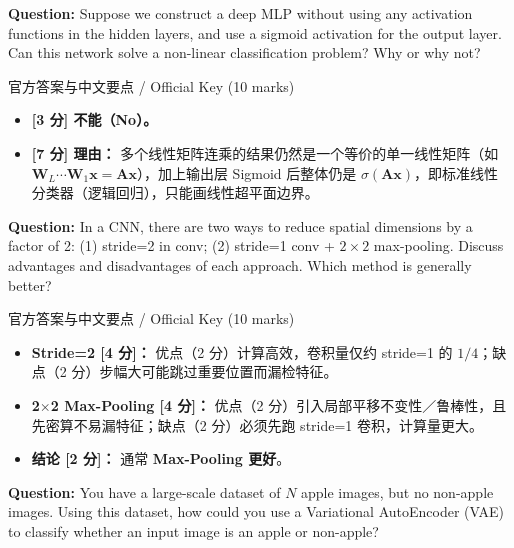 \textbf{Question:} Suppose we construct a deep MLP without using any activation functions in the hidden layers, and use a sigmoid activation for the output layer. Can this network solve a non-linear classification problem? Why or why not?

\begin{StudySolution}{官方答案与中文要点 / Official Key (10 marks)}
\begin{itemize}
\item \textbf{[3 分] 不能（No）。}
\item \textbf{[7 分] 理由：} 多个线性矩阵连乘的结果仍然是一个等价的单一线性矩阵（如 $\mathbf{W}_L\cdots\mathbf{W}_1\mathbf{x} = \mathbf{A}\mathbf{x}$），加上输出层 Sigmoid 后整体仍是 $\sigma(\mathbf{A}\mathbf{x})$，即标准线性分类器（逻辑回归），只能画线性超平面边界。
\end{itemize}
\end{StudySolution}

\textbf{Question:} In a CNN, there are two ways to reduce spatial dimensions by a factor of 2: (1) stride=2 in conv; (2) stride=1 conv + $2\times 2$ max-pooling. Discuss advantages and disadvantages of each approach. Which method is generally better?

\begin{StudySolution}{官方答案与中文要点 / Official Key (10 marks)}
\begin{itemize}
\item \textbf{Stride=2 [4 分]：} 优点（2 分）计算高效，卷积量仅约 stride=1 的 $1/4$；缺点（2 分）步幅大可能跳过重要位置而漏检特征。
\item \textbf{2\ensuremath{\times}2 Max-Pooling [4 分]：} 优点（2 分）引入局部平移不变性／鲁棒性，且先密算不易漏特征；缺点（2 分）必须先跑 stride=1 卷积，计算量更大。
\item \textbf{结论 [2 分]：} 通常 \textbf{Max-Pooling 更好}。
\end{itemize}
\end{StudySolution}

\textbf{Question:} You have a large-scale dataset of $N$ apple images, but no non-apple images. Using this dataset, how could you use a Variational AutoEncoder (VAE) to classify whether an input image is an apple or non-apple?

